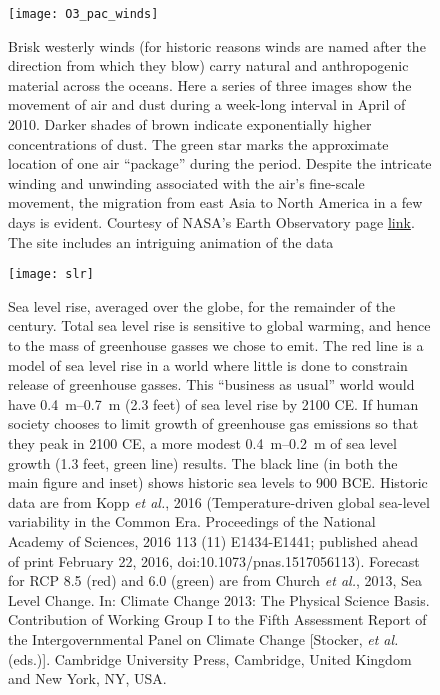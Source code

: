 \newpage
\begin{figure}[p]
\centering
\texttt{[image: O3\_pac\_winds]}%

\caption{Brisk westerly winds (for historic reasons winds are named after the direction from which they blow) carry natural and anthropogenic material across the oceans. Here a series of three images show the movement of air and dust during a week-long interval in April of 2010. Darker shades of brown indicate exponentially higher concentrations of dust. The green star marks the approximate location of one air ``package'' during the period. Despite the intricate winding and unwinding associated with the air's fine-scale movement, the migration from east Asia to North America in a few days is evident. Courtesy of NASA's Earth Observatory page \href{http://earthobservatory.nasa.gov/IOTD/view.php?id=78742}{link}. The site includes an intriguing animation of the data}

\label{fig:O3_pac_winds}
\end{figure}

\newpage
\begin{figure}[p]
\centering
\texttt{[image: slr]}%

\caption{Sea level rise, averaged over the globe, for the remainder of the century. Total sea level rise is sensitive to global warming, and hence to the mass of greenhouse gasses we chose to emit. The red line is a model of sea level rise in a world where little is done to constrain release of greenhouse gasses. This ``business as usual'' world would have \SIrange{0.4}{0.7}{\metre} (2.3 feet) of sea level rise by 2100 CE. If human society chooses to limit growth of greenhouse gas emissions so that they peak in 2100 CE, a more modest \SIrange{0.4}{0.2}{\metre} of sea level growth (1.3 feet, green line) results. The black line (in both the main figure and inset) shows historic sea levels to 900 BCE. Historic data are from Kopp \textit{et al.}, 2016 (Temperature-driven global sea-level variability in the Common Era. Proceedings of the National Academy of Sciences, 2016 113 (11) E1434-E1441; published ahead of print February 22, 2016, doi:10.1073/pnas.1517056113). Forecast for RCP 8.5 (red) and 6.0 (green) are from Church \textsl{et al.}, 2013, Sea Level Change. In: Climate Change 2013: The Physical Science Basis. Contribution of Working Group I to the Fifth Assessment Report of the Intergovernmental Panel on Climate Change [Stocker, \textit{et al.} (eds.)]. Cambridge University Press, Cambridge, United Kingdom and New York, NY, USA. }

\label{fig:slr}

\end{figure}

